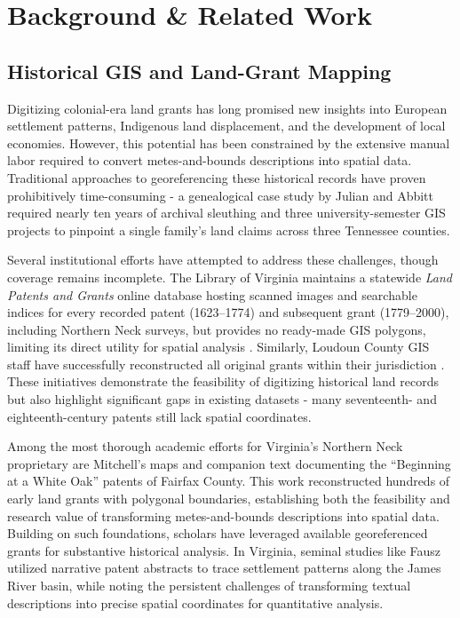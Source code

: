 \section{Background \& Related Work}\label{background-related-work}

\subsection{Historical GIS and Land-Grant
Mapping}\label{historical-gis-and-land-grant-mapping}

Digitizing colonial-era land grants has long promised new insights into
European settlement patterns, Indigenous land displacement, and the
development of local economies. However, this potential has been
constrained by the extensive manual labor required to convert
metes-and-bounds descriptions into spatial data. Traditional approaches
to georeferencing these historical records have proven prohibitively
time-consuming - a genealogical case study by Julian and Abbitt
\citep{Julian2014_tennessee} required nearly ten years of archival
sleuthing and three university-semester GIS projects to pinpoint a
single family's land claims across three Tennessee counties.

Several institutional efforts have attempted to address these
challenges, though coverage remains incomplete. The Library of Virginia
maintains a statewide \emph{Land Patents and Grants} online database
hosting scanned images and searchable indices for every recorded patent
(1623--1774) and subsequent grant (1779--2000), including Northern Neck
surveys, but provides no ready-made GIS polygons, limiting its direct
utility for spatial analysis \citep{lva_patents_db}. Similarly, Loudoun
County GIS staff have successfully reconstructed all original grants
within their jurisdiction \citep{loudoun_grants_dataset}. These
initiatives demonstrate the feasibility of digitizing historical land
records but also highlight significant gaps in existing datasets - many
seventeenth- and eighteenth-century patents still lack spatial
coordinates.

Among the most thorough academic efforts for Virginia's Northern Neck
proprietary are Mitchell's \citep{mitchell1977whiteoak} maps and
companion text documenting the ``Beginning at a White Oak'' patents of
Fairfax County. This work reconstructed hundreds of early land grants
with polygonal boundaries, establishing both the feasibility and
research value of transforming metes-and-bounds descriptions into
spatial data. Building on such foundations, scholars have leveraged
available georeferenced grants for substantive historical analysis. In
Virginia, seminal studies like Fausz \citep{Fausz1971_settlement}
utilized narrative patent abstracts to trace settlement patterns along
the James River basin, while noting the persistent challenges of
transforming textual descriptions into precise spatial coordinates for
quantitative analysis.


